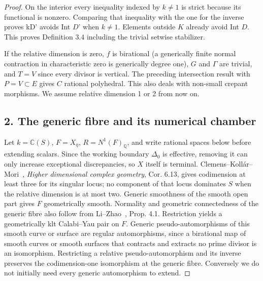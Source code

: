 \documentclass[11pt]{article}
\begin{document}
\begin{proof}
On the interior every inequality indexed by \(k\ne1\) is strict because its functional is nonzero.
Comparing that inequality with the one for the inverse proves kD' avoids Int \(D\)' when \(k\ne1\).
Elements outside \(K\) already avoid Int \(D\). This proves Definition 3.4 including the trivial setwise
stabilizer.

If the relative dimension is zero, \(f\) is birational (a generically finite normal contraction in
characteristic zero is generically degree one), \(G\) and \(\Gamma\) are trivial, and \(T=V\) since every
divisor is vertical. The preceding intersection result with \(P=V\subset E\) gives \(C\) rational
polyhedral. This also deals with non-small crepant morphisms. We assume relative dimension 1 or 2 from
now on.

\subsection*{2. The generic fibre and its numerical chamber}

Let \(k=\mathbb C(S)\), \(F=X_\eta\), \(R=N^1(F)_{\mathbb Q}\), and write rational spaces below before
extending scalars. Since the working boundary \(\Delta_0\) is effective, removing it can only increase
exceptional discrepancies, so \(X\) itself is terminal. Clemens--Kollár--Mori~\cite{CKM}, \emph{Higher
dimensional complex geometry}, Cor. 6.13, gives codimension at least three for its singular locus; no
component of that locus dominates \(S\) when the relative dimension is at most two. Generic smoothness of
the smooth open part gives \(F\) geometrically smooth. Normality and geometric connectedness of the
generic fibre also follow from Li--Zhao~\cite{LiZhao}, Prop. 4.1. Restriction yields a geometrically klt
Calabi--Yau pair on \(F\). Generic pseudo-automorphisms of this smooth curve or surface are regular
automorphisms, since a birational map of smooth curves or smooth surfaces that contracts and extracts no
prime divisor is an isomorphism. Restricting a relative pseudo-automorphism and its inverse preserves the
codimension-one isomorphism at the generic fibre. Conversely we do not initially need every generic
automorphism to extend.


\end{proof}
\end{document}

